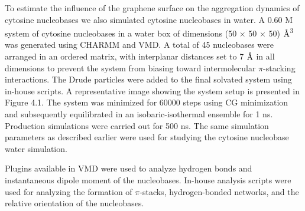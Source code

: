 To estimate the influence of the graphene surface on the aggregation dynamics of cytosine nucleobases we also simulated cytosine nucleobases in water. A 0.60 M system of cytosine nucleobases in a water box of dimensions (50 × 50 × 50) $\text{\normalfont\AA}$\textsuperscript{3} was generated using CHARMM and VMD. A total of 45 nucleobases were arranged in an ordered matrix, with interplanar distances set to 7 $\text{\normalfont\AA}$ in all dimensions to prevent the system from biasing toward intermolecular $\pi$-stacking interactions. The Drude particles were added to the final solvated system using in-house scripts. A representative image showing the system setup is presented in Figure 4.1. The system was minimized for 60000 steps using CG minimization and subsequently equilibrated in an isobaric-isothermal ensemble for 1 ns. Production simulations were carried out for 500 ns. The same simulation parameters as described earlier were used for studying the cytosine nucleobase water simulation.

Plugins available in VMD were used to analyze hydrogen bonds and instantaneous dipole moment of the nucleobases. In-house analysis scripts were used for analyzing the formation of $\pi$-stacks, hydrogen-bonded networks, and the relative orientation of the nucleobases.

